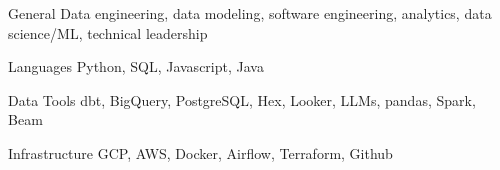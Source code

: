 

\begin{cvskills}
  \cvskill
    {General}
    {Data engineering, data modeling, software engineering, analytics, data science/ML, technical leadership}

  \cvskill
    {Languages}
    {Python, SQL, Javascript, Java}

  \cvskill
    {Data Tools}
    {dbt, BigQuery, PostgreSQL, Hex, Looker, LLMs, pandas, Spark, Beam}

  \cvskill
    {Infrastructure}
    {GCP, AWS, Docker, Airflow, Terraform, Github}

\end{cvskills}
